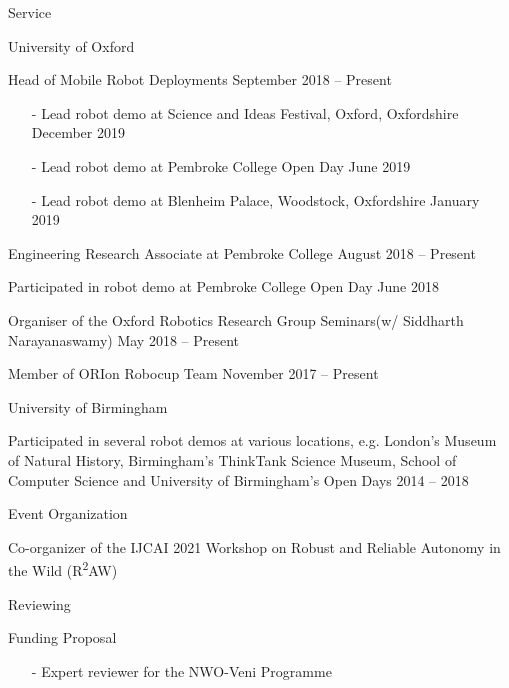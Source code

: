 
\begin{rSection}{Service}

\begin{rSubsection}{University of Oxford}{}{}{}
\item Head of Mobile Robot Deployments \hfill  September 2018 -- Present
\begin{itemize}
\vspace*{-0.2cm}
\item[-]  Lead robot demo at Science and Ideas Festival, Oxford, Oxfordshire \hfill December 2019\vspace*{-0.2cm}
\item[-]  Lead robot demo at Pembroke College Open Day \hfill June 2019\vspace*{-0.2cm}
\item[-]  Lead robot demo at Blenheim Palace, Woodstock, Oxfordshire \hfill January 2019
\end{itemize}
\item Engineering Research Associate at Pembroke College \hfill August 2018 -- Present
\item Participated in robot demo at Pembroke College Open Day \hfill June 2018
\item Organiser of the Oxford Robotics Research Group Seminars\newline (w/ Siddharth Narayanaswamy) \hfill May 2018 -- Present
\item Member of ORIon Robocup Team \hfill November 2017 -- Present
\end{rSubsection}


\begin{rSubsection}{University of Birmingham}{}{}{}
\item Participated in several robot demos at various locations, e.g. London's  Museum of Natural History, Birmingham's ThinkTank Science Museum,  School of  Computer Science and University of Birmingham's Open Days  \hspace*{10.2cm}2014 -- 2018
\end{rSubsection}


\begin{rSubsection}{Event Organization}{}{}{}
\item Co-organizer of the IJCAI 2021 Workshop on  Robust and Reliable Autonomy in the Wild (R\textsuperscript{2}AW)
\end{rSubsection}


\begin{rSubsection}{Reviewing}{}{}{}
\item Funding Proposal
\begin{itemize}
\vspace*{-0.2cm}
\item[-] Expert reviewer for the NWO-Veni Programme
\end{itemize}


\end{rSubsection}
\end{rSection}

